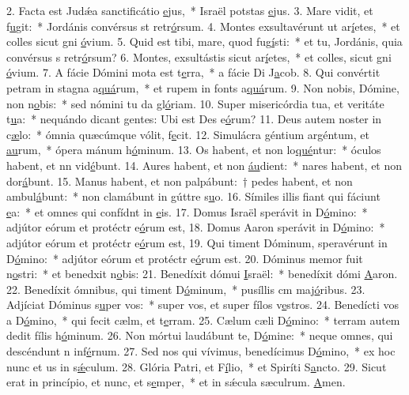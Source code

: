 2. Facta est Judǽa sanctificátio \uline{e}jus,~* Israël potstas \uline{e}jus.
3. Mare vidit, et f\uline{u}git:~* Jordánis convérsus st retr\uline{ó}rsum.
4. Montes exsultavérunt ut ar\uline{í}etes,~* et colles sicut gni \uline{ó}vium.
5. Quid est tibi, mare, quod fug\uline{í}sti:~* et tu, Jordánis, quia convérsus s retr\uline{ó}rsum?
6. Montes, exsultástis sicut ar\uline{í}etes,~* et colles, sicut gni \uline{ó}vium.
7. A fácie Dómini mota est t\uline{e}rra,~* a fácie Di J\uline{a}cob.
8. Qui convértit petram in stagna a\uline{quá}rum,~* et rupem in fonts a\uline{quá}rum.
9. Non nobis, Dómine, non n\uline{o}bis:~* sed nómini tu da gl\uline{ó}riam.
10. Super misericórdia tua, et veritáte t\uline{u}a:~* nequándo dicant gentes: Ubi est Des e\uline{ó}rum?
11. Deus autem noster in c\uline{æ}lo:~* ómnia quæcúmque vólit, f\uline{e}cit.
12. Simulácra géntium argéntum, et \uline{au}rum,~* ópera mánum h\uline{ó}minum.
13. Os habent, et non lo\uline{qué}ntur:~* óculos habent, et nn vid\uline{é}bunt.
14. Aures habent, et non \uline{áu}dient:~* nares habent, et non dor\uline{á}bunt.
15. Manus habent, et non palpábunt:~† pedes habent, et non ambul\uline{á}bunt:~* non clamábunt in gúttre s\uline{u}o.
16. Símiles illis fiant qui fáciunt \uline{e}a:~* et omnes qui confídnt in \uline{e}is.
17. Domus Israël sperávit in D\uline{ó}mino:~* adjútor eórum et protéctr e\uline{ó}rum est,
18. Domus Aaron sperávit in D\uline{ó}mino:~* adjútor eórum et protéctr e\uline{ó}rum est,
19. Qui timent Dóminum, speravérunt in D\uline{ó}mino:~* adjútor eórum et protéctr e\uline{ó}rum est.
20. Dóminus memor fuit n\uline{o}stri:~* et benedxit n\uline{o}bis:
21. Benedíxit dómui \uline{I}sraël:~* benedíxit dómi \uline{A}aron.
22. Benedíxit ómnibus, qui timent D\uline{ó}minum,~* pusíllis cm maj\uline{ó}ribus.
23. Adjíciat Dóminus s\uline{u}per vos:~* super vos, et super fílos v\uline{e}stros.
24. Benedícti vos a D\uline{ó}mino,~* qui fecit cælm, et t\uline{e}rram.
25. Cælum cæli D\uline{ó}mino:~* terram autem dedit fílis h\uline{ó}minum.
26. Non mórtui laudábunt te, D\uline{ó}mine:~* neque omnes, qui descéndunt n inf\uline{é}rnum.
27. Sed nos qui vívimus, benedícimus D\uline{ó}mino,~* ex hoc nunc et us in s\uline{ǽ}culum.
28. Glória Patri, et F\uline{í}lio,~* et Spiríti S\uline{a}ncto.
29. Sicut erat in princípio, et nunc, et s\uline{e}mper,~* et in sǽcula sæculrum. \uline{A}men.
